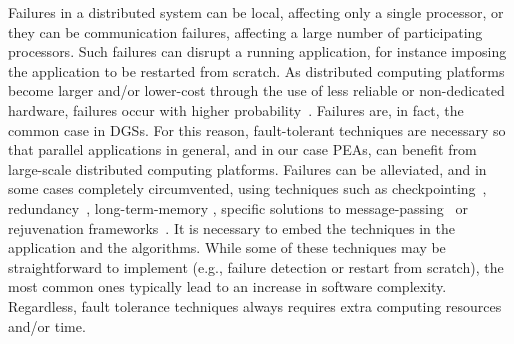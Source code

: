 \documentclass[graybox]{sty/svmult}
\begin{document}
Failures in a distributed system can be local, affecting only a single processor, or they can be
communication failures, affecting a large number of participating
processors.  Such failures can disrupt a running application,
for instance imposing the application to be restarted from scratch.  
As distributed computing platforms become larger
and/or lower-cost through the use of less reliable or non-dedicated hardware, 
failures occur with higher probability~\cite{hardware-failures,hardware-reliability-cost,hardware-reliability}. Failures are, in fact, the common case in
DGSs.  For this reason, fault-tolerant techniques are necessary so that
parallel applications in general, and in our case PEAs, can benefit
from large-scale distributed computing platforms.  Failures can
be alleviated, and in some cases completely circumvented, using
techniques such as checkpointing~\cite{biblia-checkpointing},
redundancy~\cite{primary_backup}, long-term-memory 
\cite{epidemic-algorithms-fault-tolerance-dream}, specific solutions
to message-passing~\cite{starfish-fault-tolerant} or rejuvenation
frameworks~\cite{rejuvenation}. 
It is necessary to embed the techniques in the application and the
algorithms. While some of these techniques may be straightforward to
implement (e.g., failure detection or restart from scratch), the most
common ones typically lead to an increase in software complexity.  Regardless,
fault tolerance techniques always requires extra computing
resources and/or time.
\end{document}
